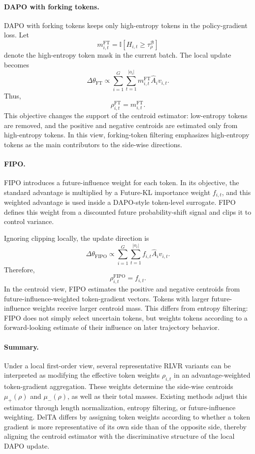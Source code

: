 \documentclass{llmxive}
\begin{document}
\paragraph{DAPO with forking tokens.}
DAPO with forking tokens keeps only high-entropy tokens in the policy-gradient
loss. Let
\[
m_{i,t}^{\mathrm{FT}}
=
\mathbb{I}\!\left[H_{i,t}\ge \tau_\rho^{\mathcal B}\right]
\]
denote the high-entropy token mask in the current batch. The local update becomes
\begin{equation}
\label{eq:ft-local-centroid}
\Delta\theta_{\mathrm{FT}}
\propto
\sum_{i=1}^{G}
\sum_{t=1}^{|o_i|}
m_{i,t}^{\mathrm{FT}}\hat A_i v_{i,t}.
\end{equation}
Thus,
\[
\rho_{i,t}^{\mathrm{FT}}=m_{i,t}^{\mathrm{FT}}.
\]
This objective changes the support of the centroid estimator: low-entropy tokens
are removed, and the positive and negative centroids are estimated only from
high-entropy tokens. In this view, forking-token filtering emphasizes
high-entropy tokens as the main contributors to the side-wise directions.

\paragraph{FIPO.}
FIPO introduces a future-influence weight for each token. In its objective, the
standard advantage is multiplied by a Future-KL importance weight \(f_{i,t}\),
and this weighted advantage is used inside a DAPO-style token-level surrogate.
FIPO defines this weight from a discounted future probability-shift signal and
clips it to control variance.

Ignoring clipping locally, the update direction is
\begin{equation}
\label{eq:fipo-local-centroid}
\Delta\theta_{\mathrm{FIPO}}
\propto
\sum_{i=1}^{G}
\sum_{t=1}^{|o_i|}
f_{i,t}\hat A_i v_{i,t}.
\end{equation}
Therefore,
\[
\rho_{i,t}^{\mathrm{FIPO}}=f_{i,t}.
\]
In the centroid view, FIPO estimates the positive and negative centroids from
future-influence-weighted token-gradient vectors. Tokens with larger
future-influence weights receive larger centroid mass. This differs from entropy
filtering: FIPO does not simply select uncertain tokens, but weights tokens
according to a forward-looking estimate of their influence on later trajectory
behavior.

\paragraph{Summary.}
Under a local first-order view, several representative RLVR variants can be
interpreted as modifying the effective token weights \(\rho_{i,t}\) in an
advantage-weighted token-gradient aggregation. These weights determine the
side-wise centroids \(\mu_+(\rho)\) and \(\mu_-(\rho)\), as well as their total
masses. Existing methods adjust this estimator through length normalization,
entropy filtering, or future-influence weighting. DelTA differs by assigning
token weights according to whether a token gradient is more representative of
its own side than of the opposite side, thereby aligning the centroid estimator
with the discriminative structure of the local DAPO update.
\end{document}
